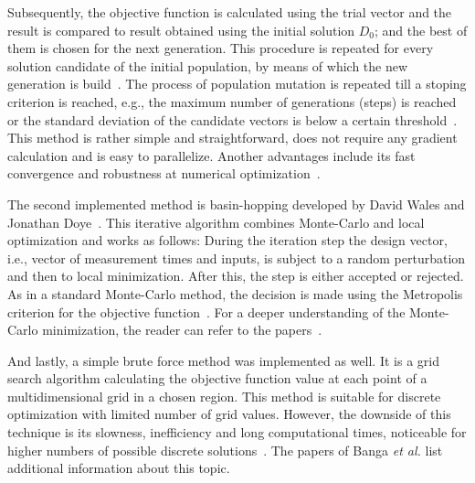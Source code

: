 \documentclass[10pt,A4paper]{article}
\newcommand{\etal}{{\textit{et al. }}}
\begin{document}
Subsequently, the objective function is calculated using the trial vector and the result is compared to result obtained using the initial solution $D_0$; and the best of them is chosen for the next generation.
This procedure is repeated for every solution candidate of the initial population, by means of which the new generation is build~\cite{scipydiffev}.
The process of population mutation is repeated till a stoping criterion is reached, e.g., the maximum number of generations (steps) is reached or the standard deviation of the candidate vectors is below a certain threshold~\cite{Zielinski_DE}.
This method is rather simple and straightforward, does not require any gradient calculation and is easy to parallelize.
Another advantages include its fast convergence and robustness at numerical optimization~\cite{babu_differential_2007}.
\newline

The second implemented method is basin-hopping developed by David Wales and Jonathan Doye~\cite{wales_global_1997}.
This iterative algorithm combines Monte-Carlo and local optimization and works as follows:
During the iteration step the design vector, i.e., vector of measurement times and inputs, is subject to a random perturbation and then to local minimization.
After this, the step is either accepted or rejected.
As in a standard Monte-Carlo method, the decision is made using the Metropolis criterion for the objective function~\cite{scipybashop}.
For a deeper understanding of the Monte-Carlo minimization, the reader can refer to the papers~\cite{li_monte_1987, beichl_metropolis_2000}.
\newline

And lastly, a simple brute force method was implemented as well.
It is a grid search algorithm calculating the objective function value at each point of a multidimensional grid in a chosen region.
This method is suitable for discrete optimization with limited number of grid values.
However, the downside of this technique is its slowness, inefficiency and long computational times, noticeable for higher numbers of possible discrete solutions~\cite{scipybrute}.
The papers of Banga \etal \cite{banga_global_1996, banga_dynamic_2005, bangaImprovingFoodProcessing2003} list additional information about this topic.
%
\end{document}
